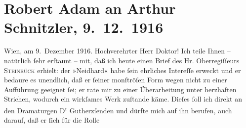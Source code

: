 

         
         \newcommand{\erwaehntePersonen}{Personen: Gerhard Gutherz, Albert Steinrück}
         \newcommand{\erwaehnteInstitutionen}{}
         \newcommand{\erwaehnteOrte}{Orte: Wien}
         \newcommand{\erwaehnteWerke}{Werke: Der Fremde, Die Geschichte des Alî ibn Bekkâr mit Schams an-Nahâr, Neidhard}
               \section[Robert Adam an Arthur Schnitzler, 9. 12. 1916]{ Robert Adam an Arthur Schnitzler, 9. 12. 1916}\nopagebreak{}\rehead{ }\begin{ledgroupsized}[t]{13cm}\normalsize\beginnumbering \toendnotes[C]{\smallbreak\pagebreak[2]} 
\toendnotes[C]{\smallbreak}\pstart
           \raggedleft{}{\pb}Wien, am 9. Dezember
                        1916.\pend
           \pstart{}Hochverehrter Herr Doktor!\pend\pstart
           Ich teile Ihnen – natürlich ſehr erſtaunt – mit, daß ich heute einen Brief des
                    Hr. Oberregiſſeurs \textsc{Steinrück} erhielt: der »Neidhard« habe ſein
                    ehrliches Intereſſe erweckt und er bedaure es unendlich, daß er ſeiner
                    monſtröſen Form wegen nicht zu einer Aufführung geeignet ſei; er rate mir zu
                    einer Überarbeitung unter herzhaften Strichen, wodurch ein wirkſames Werk
                    zuſtande käme. Dieſes ſoll ich direkt an den Dramaturgen D\textsuperscript{r}{ }Gutherzſenden und dürfte mich auf ihn be{\pb}rufen, auch darauf, daß er ſich für die Rolle

\end{ledgroupsized}
